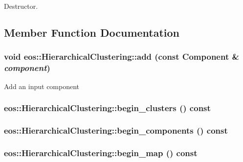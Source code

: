 Destructor. 

\subsection{Member Function Documentation}
\hypertarget{classeos_1_1HierarchicalClustering_ae42a0dd678f5258605a225a4b53eb487}{
\subsubsection[{add}]{\setlength{\rightskip}{0pt plus 5cm}void eos::HierarchicalClustering::add (const {\bf Component} \& {\em component})}}
\label{classeos_1_1HierarchicalClustering_ae42a0dd678f5258605a225a4b53eb487}
Add an input component \hypertarget{classeos_1_1HierarchicalClustering_ac30248ba80ef8483617c6d0b3cc84e98}{
\subsubsection[{begin\_\-clusters}]{ eos::HierarchicalClustering::begin\_\-clusters () const}}
\label{classeos_1_1HierarchicalClustering_ac30248ba80ef8483617c6d0b3cc84e98}
\hypertarget{classeos_1_1HierarchicalClustering_a34dc8e608ce186011554a7e108216b78}{
\subsubsection[{begin\_\-components}]{ eos::HierarchicalClustering::begin\_\-components () const}}
\label{classeos_1_1HierarchicalClustering_a34dc8e608ce186011554a7e108216b78}
\hypertarget{classeos_1_1HierarchicalClustering_a2b2ea33a67b4e8f66ab8b6e4dd6a6710}{
\subsubsection[{begin\_\-map}]{ eos::HierarchicalClustering::begin\_\-map () const}}
